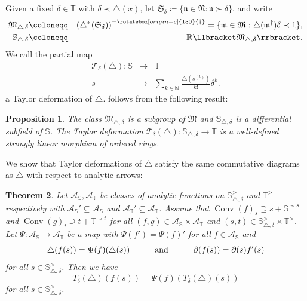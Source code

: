 \documentclass{article}
\newcommand{\assign}{\coloneqq}
\newcommand{\of}{:}
\newcommand{\suchthat}{:}
\newcommand{\tmop}[1]{\ensuremath{\operatorname{#1}}}
\newtheorem{theorem}{Theorem}[section]
\newtheorem{proposition}[theorem]{Proposition}
\theoremstyle{remark}\newtheorem*{convention*}{Convention}
\begin{document}
Given a fixed $\delta \in \mathbb{T}$ with $\delta \prec \triangle (x)$, let
$\mathfrak{S}_{\delta} \assign \{ \mathfrak{n} \in \mathfrak{N}: \mathfrak{n}
\succ \delta \}$, and write
\begin{eqnarray*}
  \mathfrak{M}_{\triangle, \delta} & \assign & \left( {\triangle^{\ast}}^{}
  (\mathfrak{S}_{\delta}) \right)^{-\rotatebox[origin=c]{180}{\small{\dag}}}= \{\mathfrak{m} \in
  \mathfrak{M} \suchthat \triangle (\mathfrak{m}^{\dag}) \delta \prec 1\},\\
  \mathbb{S}_{\triangle, \delta} & \assign & \mathbb{R} \llbracket
  \mathfrak{M}_{\triangle, \delta} \rrbracket .
\end{eqnarray*}
We call the partial map
\begin{eqnarray*}
  \mathcal{T}_{\delta} (\triangle) \of \mathbb{S} & \longrightarrow &
  \mathbb{T}\\
  s & \longmapsto & \sum_{k \in \mathbb{N}} \frac{\triangle (s^{(k)})}{k!}
  \delta^k .
\end{eqnarray*}
a Taylor deformation of $\triangle$.  follows from
the following result:

\begin{proposition}
  \label{prop-Taylor-deformation}The class $\mathfrak{M}_{\triangle, \delta}$
  is a subgroup of $\mathfrak{M}$ and $\mathbb{S}_{\triangle, \delta}$ is a
  differential subfield of $\mathbb{S}$. The Taylor deformation
  $\mathcal{T}_{\delta} (\triangle) \of \mathbb{S}_{\triangle, \delta}
  \longrightarrow \mathbb{T}$ is a well-defined strongly linear morphism of
  ordered rings.
\end{proposition}

We show that Taylor deformations of $\triangle$ satisfy the same commutative
diagrams as $\triangle$ with respect to analytic arrows:

\begin{theorem}
  \label{th-Taylor-analytic}Let $\mathcal{A}_{\mathbb{S}},
  \mathcal{A}_{\mathbb{T}}$ be classes of analytic functions on
  $\mathbb{S}_{\triangle, \delta}^{>}$ and $\mathbb{T}^{>}$ respectively with
  $\mathcal{A}_{\mathbb{S}}' \subseteq \mathcal{A}_{\mathbb{S}}$ and
  $\mathcal{A}_{\mathbb{T}}' \subseteq \mathcal{A}_{\mathbb{T}}$. Assume that
  $\tmop{Conv} (f)_s \supseteq s +\mathbb{S}^{\prec s}$ and $\tmop{Conv} (g)_t
  \supseteq t +\mathbb{T}^{\prec t}$ for all $(f, g) \in
  \mathcal{A}_{\mathbb{S}} \times \mathcal{A}_{\mathbb{T}}$ and $(s, t) \in
  \mathbb{S}_{\triangle, \delta}^{>} \times \mathbb{T}^{>}$. Let $\Psi \of
  \mathcal{A}_{\mathbb{S}} \longrightarrow \mathcal{A}_{\mathbb{T}}$ be a map
  with $\Psi (f') = \Psi (f)'$ for all $f \in \mathcal{A}_{\mathbb{S}}$ and
  \[ \triangle (f (s)) = \Psi (f) (\triangle (s))
     \text{{\hspace{3em}}and{\hspace{3em}}$\partial (f (s)) = \partial (s) f'
     (s)$} \]
  for all $s \in \mathbb{S}_{\triangle, \delta}^{>}$. Then we have
  \[ T_{\delta} (\triangle) (f (s)) = \Psi (f) (T_{\delta} (\triangle) (s)) \]
  for all $s \in \mathbb{S}_{\triangle, \delta}^{>}$.
\end{theorem}
\end{document}
